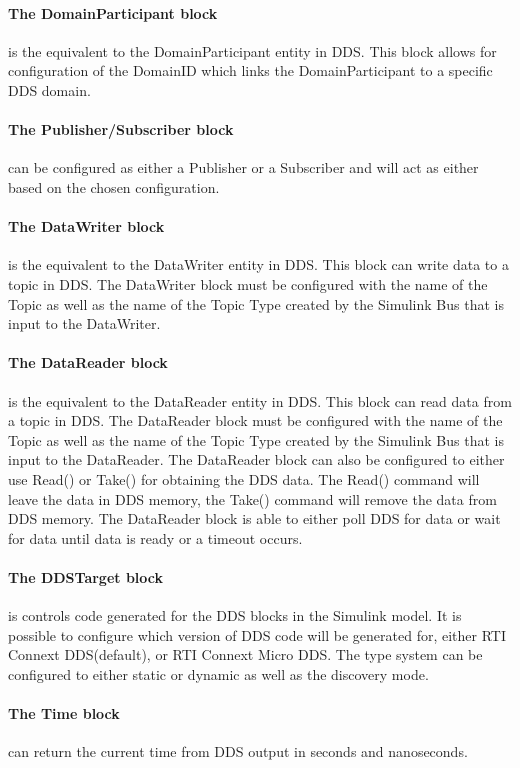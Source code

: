 \paragraph{The DomainParticipant block} is the equivalent to the DomainParticipant entity in DDS. This block allows for configuration of the DomainID which links the DomainParticipant to a specific DDS domain.

\paragraph{The Publisher/Subscriber block} can be configured as either a Publisher or a Subscriber and will act as either based on the chosen configuration.

\paragraph{The DataWriter block} is the equivalent to the DataWriter entity in DDS. This block can write data to a topic in DDS. The DataWriter block must be configured with the name of the Topic as well as the name of the Topic Type created by the Simulink Bus that is input to the DataWriter.

\paragraph{The DataReader block} is the equivalent to the DataReader entity in DDS. This block can read data from a topic in DDS. The DataReader block must be configured with the name of the Topic as well as the name of the Topic Type created by the Simulink Bus that is input to the DataReader. The DataReader block can also be configured to either use Read() or Take() for obtaining the DDS data. The Read() command will leave the data in DDS memory, the Take() command will remove the data from DDS memory. The DataReader block is able to either poll DDS for data or wait for data until data is ready or a timeout occurs.

\paragraph{The DDSTarget block} is controls code generated for the DDS blocks in the Simulink model. It is possible to configure which version of DDS code will be generated for, either RTI Connext DDS(default), or RTI Connext Micro DDS. The type system can be configured to either static or dynamic as well as the discovery mode.

\paragraph{The Time block} can return the current time from DDS output in seconds and nanoseconds.